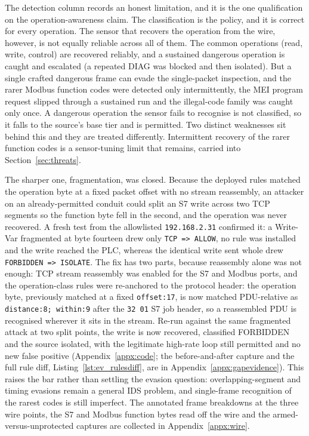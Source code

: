 The detection column records an honest limitation, and it is the one qualification on the operation-awareness claim. The classification is the policy, and it is correct for every operation. The sensor that recovers the operation from the wire, however, is not equally reliable across all of them. The common operations (read, write, control) are recovered reliably, and a sustained dangerous operation is caught and escalated (a repeated DIAG was blocked and then isolated). But a single crafted dangerous frame can evade the single-packet inspection, and the rarer Modbus function codes were detected only intermittently, the MEI program request slipped through a sustained run and the illegal-code family was caught only once. A dangerous operation the sensor fails to recognise is not classified, so it falls to the source's base tier and is permitted. Two distinct weaknesses sit behind this and they are treated differently. Intermittent recovery of the rarer function codes is a sensor-tuning limit that remains, carried into Section~\ref{sec:threats}.

The sharper one, fragmentation, was closed. Because the deployed rules matched the operation byte at a fixed packet offset with no stream reassembly, an attacker on an already-permitted conduit could split an S7 write across two TCP segments so the function byte fell in the second, and the operation was never recovered. A fresh test from the allowlisted \texttt{192.168.2.31} confirmed it: a Write-Var fragmented at byte fourteen drew only \texttt{TCP => ALLOW}, no rule was installed and the write reached the PLC, whereas the identical write sent whole drew \texttt{FORBIDDEN => ISOLATE}. The fix has two parts, because reassembly alone was not enough: TCP stream reassembly was enabled for the S7 and Modbus ports, and the operation-class rules were re-anchored to the protocol header: the operation byte, previously matched at a fixed \texttt{offset:17}, is now matched PDU-relative as \texttt{distance:8; within:9} after the \texttt{32 01} S7 job header, so a reassembled PDU is recognised wherever it sits in the stream. Re-run against the same fragmented attack at two split points, the write is now recovered, classified FORBIDDEN and the source isolated, with the legitimate high-rate loop still permitted and no new false positive (Appendix~\ref{appx:code}; the before-and-after capture and the full rule diff, Listing~\ref{lst:ev_rulesdiff}, are in Appendix~\ref{appx:gapevidence}). This raises the bar rather than settling the evasion question: overlapping-segment and timing evasions remain a general IDS problem, and single-frame recognition of the rarest codes is still imperfect. The annotated frame breakdowns at the three wire points, the S7 and Modbus function bytes read off the wire and the armed-versus-unprotected captures are collected in Appendix~\ref{appx:wire}.


